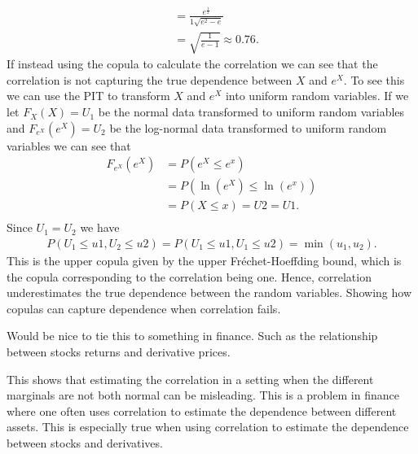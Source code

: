\begin{example}
\begin{align*}
        & = \frac{e^{\frac{1}{2}}}{1\sqrt{e^2-e}}\\
        &=\sqrt{\frac{1}{e-1}} \approx 0.76. 
    \end{align*}
    If instead using the copula to calculate the correlation we can see that the correlation is not capturing the true dependence between $X$ and $e^X$. To see this we can use the \gls{PIT} to transform $X$ and $e^X$ into uniform random variables. If we let $F_X(X)=U_1$ be the normal data transformed to uniform random variables and $F_{e^X}(e^X)=U_2$ be the log-normal data transformed to uniform random variables we can see that 
    \begin{align*}
        F_{e^X}(e^X) &= P(e^X \leq e^x)\\
        &= P(\ln(e^X) \leq \ln (e^x))\\
        &=P(X\leq x) = U2 = U1.\\
    \end{align*}
    Since $U_1 = U_2$ we have 
    \begin{align*}
        P(U_1\leq u1, U_2\leq u2) = P(U_1\leq u1, U_1\leq u2) = \min(u_1,u_2).
    \end{align*}
    This is the upper copula given by the upper Fréchet-Hoeffding bound, which is the copula corresponding to the correlation being one. Hence, correlation underestimates  the true dependence between the random variables. Showing how copulas can capture dependence when correlation fails. 

    \begin{generalinstructions}
        Would be nice to tie this to something in finance. Such as the relationship between stocks returns and derivative prices.

        This shows that estimating the correlation in a setting when the different marginals are not both normal can be misleading. This is a problem in finance where one often uses correlation to estimate the dependence between different assets. This is especially true when using correlation to estimate the dependence between stocks and derivatives.
    \end{generalinstructions}


\end{example}
    
